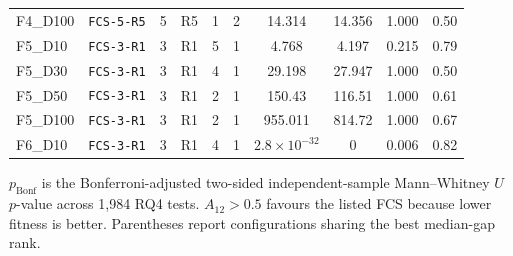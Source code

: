 \begin{table}[H]
\begin{tabular}{llcccccccc}
F4\_D100 & \texttt{FCS-5-R5} & 5 & R5 & 1 & 2 & 14.314 & 14.356 & 1.000 & 0.50 \\
F5\_D10 & \texttt{FCS-3-R1} & 3 & R1 & 5 & 1 & 4.768 & 4.197 & 0.215 & 0.79 \\
F5\_D30 & \texttt{FCS-3-R1} & 3 & R1 & 4 & 1 & 29.198 & 27.947 & 1.000 & 0.50 \\
F5\_D50 & \texttt{FCS-3-R1} & 3 & R1 & 2 & 1 & 150.43 & 116.51 & 1.000 & 0.61 \\
F5\_D100 & \texttt{FCS-3-R1} & 3 & R1 & 2 & 1 & 955.011 & 814.72 & 1.000 & 0.67 \\
F6\_D10 & \texttt{FCS-3-R1} & 3 & R1 & 4 & 1 & $2.8\!\times10^{-32}$ & 0 & 0.006 & 0.82 \\
\bottomrule
\end{tabular}
\par\smallskip
{\raggedright\footnotesize
$p_{\mathrm{Bonf}}$ is the Bonferroni-adjusted two-sided independent-sample Mann--Whitney $U$ $p$-value across 1,984 RQ4 tests. $A_{12}>0.5$ favours the listed FCS because lower fitness is better. Parentheses report configurations sharing the best median-gap rank.\par}
\end{table}
